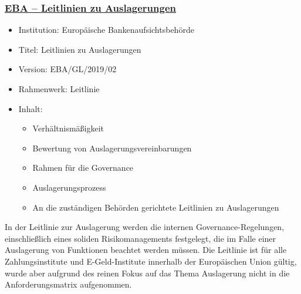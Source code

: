 
\subsubsection{\underline{EBA – Leitlinien zu Auslagerungen}}
\begin{itemize}
    \item Institution: Europäische Bankenaufsichtsbehörde
    \item Titel: Leitlinien zu Auslagerungen \autocite{eba_outsourcing_arrangements} 
    \item Version: EBA/GL/2019/02
    \item Rahmenwerk: Leitlinie
    \item Inhalt:
    \begin{itemize}
        \item Verhältnismäßigkeit 
        \item Bewertung von Auslagerungsvereinbarungen 
        \item Rahmen für die Governance
        \item Auslagerungsprozess
        \item An die zuständigen Behörden gerichtete Leitlinien zu Auslagerungen
    \end{itemize}
\end{itemize}
\bigbreak
In der Leitlinie zur Auslagerung werden die internen Governance-Regelungen, einschließlich eines soliden Risikomanagements festgelegt, die im Falle einer Auslagerung von Funktionen beachtet werden müssen. Die Leitlinie ist für alle Zahlungsinstitute und E-Geld-Institute innerhalb der Europäischen Union gültig, wurde aber aufgrund des reinen Fokus auf das Thema Auslagerung nicht in die Anforderungsmatrix aufgenommen. 


